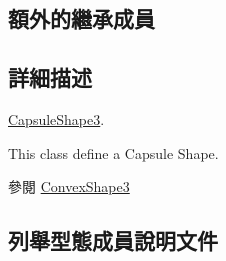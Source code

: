\subsection*{額外的繼承成員}


\subsection{詳細描述}
\hyperlink{class_magnum_1_1_capsule_shape3}{Capsule\+Shape3}. 

This class define a Capsule Shape. \begin{DoxySeeAlso}{參閱}
\hyperlink{class_magnum_1_1_convex_shape3}{Convex\+Shape3} 
\end{DoxySeeAlso}


\subsection{列舉型態成員說明文件}
